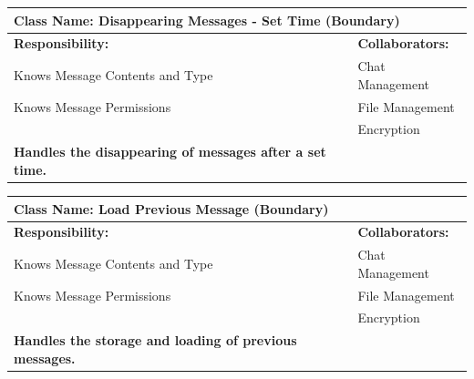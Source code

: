 \documentclass[]{article}
\begin{document}
\begin{itemize}
\begin{table}[ht]
\begin{tabular}{|p{7cm}|p{7cm}|}
		\vspace{1in} & \\
		\hline
  
		\end{tabular}
	\end{table}

	\begin{table}[ht]
		\centering
		\begin{tabular}{|p{7cm}|p{7cm}|}
		\hline 
		 \multicolumn{2}{|l|}{\textbf{Class Name: Disappearing Messages - Set Time (Boundary)
}} \\
		\hline
		\textbf{Responsibility:} & \textbf{Collaborators:} \\
		\hline
            Knows Message Contents and Type & Chat Management\\
            Knows Message Permissions & File Management\\
            & Encryption\\
            
            \vspace{0.1in}
            \textbf{Handles the disappearing of messages after a set time.}

		\vspace{1in} & \\
		\hline
  
		\end{tabular}
	\end{table}


	\begin{table}[ht]
		\centering
		\begin{tabular}{|p{7cm}|p{7cm}|}
		\hline 
		 \multicolumn{2}{|l|}{\textbf{Class Name: Load Previous Message (Boundary)
}} \\
		\hline
		\textbf{Responsibility:} & \textbf{Collaborators:} \\
		\hline
            Knows Message Contents and Type & Chat Management\\
            Knows Message Permissions & File Management\\
            & Encryption\\
            
            \vspace{0.1in}
            \textbf{Handles the storage and loading of previous messages.}

		\vspace{1in} & \\
		\hline
  

\end{tabular}
\end{table}
\end{itemize}
\end{document}
